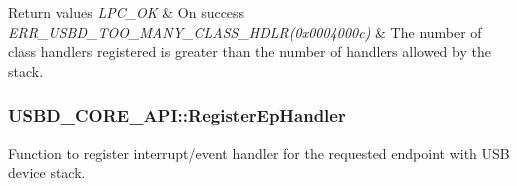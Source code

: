 \begin{DoxyRetVals}{Return values}
{\em L\-P\-C\-\_\-\-O\-K} & On success \\
\hline
{\em E\-R\-R\-\_\-\-U\-S\-B\-D\-\_\-\-T\-O\-O\-\_\-\-M\-A\-N\-Y\-\_\-\-C\-L\-A\-S\-S\-\_\-\-H\-D\-L\-R(0x0004000c)} & The number of class handlers registered is greater than the number of handlers allowed by the stack. \\
\hline
\end{DoxyRetVals}
\hypertarget{structUSBD__CORE__API_aae115addea44c865ee6e474740a9cf80}{
\subsubsection[{Register\-Ep\-Handler}]{ U\-S\-B\-D\-\_\-\-C\-O\-R\-E\-\_\-\-A\-P\-I\-::\-Register\-Ep\-Handler}}\label{structUSBD__CORE__API_aae115addea44c865ee6e474740a9cf80}
Function to register interrupt/event handler for the requested endpoint with U\-S\-B device stack.


